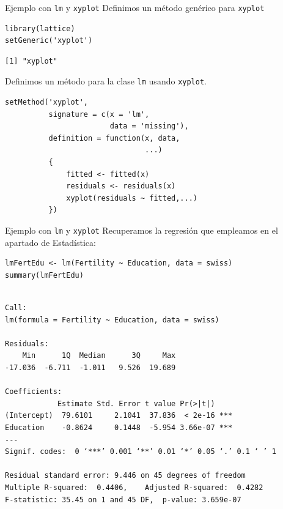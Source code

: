 \documentclass[xcolor={usenames,svgnames,dvipsnames}]{beamer}
\begin{document}
\begin{frame}[label={sec:org785edf4},fragile]{Ejemplo con \texttt{lm} y \texttt{xyplot}}
 Definimos un método genérico para \texttt{xyplot}
\lstset{language=r,label= ,caption= ,captionpos=b,numbers=none}
\begin{lstlisting}
library(lattice)
setGeneric('xyplot')
\end{lstlisting}

\begin{verbatim}
[1] "xyplot"
\end{verbatim}


Definimos un método para la clase \texttt{lm} usando \texttt{xyplot}.
\lstset{language=r,label= ,caption= ,captionpos=b,numbers=none}
\begin{lstlisting}
setMethod('xyplot',
          signature = c(x = 'lm',
                        data = 'missing'),
          definition = function(x, data,
                                ...)
          {
              fitted <- fitted(x)
              residuals <- residuals(x)
              xyplot(residuals ~ fitted,...)
          })

\end{lstlisting}
\end{frame}

\begin{frame}[label={sec:org7de9155},fragile]{Ejemplo con \texttt{lm} y \texttt{xyplot}}
 Recuperamos la regresión que empleamos en el apartado de Estadística:
\lstset{language=r,label= ,caption= ,captionpos=b,numbers=none}
\begin{lstlisting}
lmFertEdu <- lm(Fertility ~ Education, data = swiss)
summary(lmFertEdu)
\end{lstlisting}

\begin{verbatim}

Call:
lm(formula = Fertility ~ Education, data = swiss)

Residuals:
    Min      1Q  Median      3Q     Max 
-17.036  -6.711  -1.011   9.526  19.689 

Coefficients:
            Estimate Std. Error t value Pr(>|t|)    
(Intercept)  79.6101     2.1041  37.836  < 2e-16 ***
Education    -0.8624     0.1448  -5.954 3.66e-07 ***
---
Signif. codes:  0 ‘***’ 0.001 ‘**’ 0.01 ‘*’ 0.05 ‘.’ 0.1 ‘ ’ 1

Residual standard error: 9.446 on 45 degrees of freedom
Multiple R-squared:  0.4406,	Adjusted R-squared:  0.4282 
F-statistic: 35.45 on 1 and 45 DF,  p-value: 3.659e-07
\end{verbatim}
\end{frame}
\end{document}
